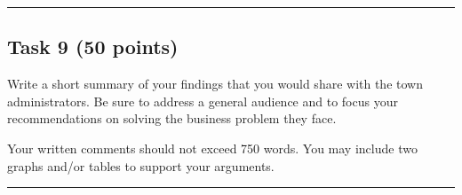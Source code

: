 \documentclass[
]{article}
\begin{document}
\begin{center}\rule{0.5\linewidth}{0.5pt}\end{center}

\hypertarget{task-9-50-points}{%
\subsection{Task 9 (50 points)}\label{task-9-50-points}}

Write a short summary of your findings that you would share with the
town administrators. Be sure to address a general audience and to focus
your recommendations on solving the business problem they face.

Your written comments should not exceed 750 words. You may include two
graphs and/or tables to support your arguments.

\begin{center}\rule{0.5\linewidth}{0.5pt}\end{center}
\end{document}
